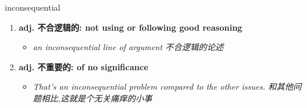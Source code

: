 
\begin{frame}
{\huge inconsequential}
\begin{center}
\begin{enumerate}\Large
  \item \textbf{adj. 不合逻辑的: not using or following good reasoning}
  \begin{itemize}
    \item \em{\Large{an inconsequential line of argument 不合逻辑的论述}}
  \end{itemize}
  \item \textbf{adj. 不重要的: of no significance}
  \begin{itemize}
    \item \em{\Large{That's an inconsequential problem compared to the other issues. 和其他问题相比,这就是个无关痛痒的小事}}
  \end{itemize}
\end{enumerate}
\end{center}
\end{frame}
